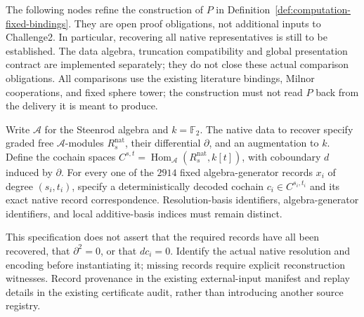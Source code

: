 The following nodes refine the construction of $P$ in
Definition~\ref{def:computation-fixed-bindings}. They are open proof
obligations, not additional inputs to Challenge2. In particular, recovering
all native representatives is still to be established. The data algebra,
truncation compatibility and global presentation contract are implemented
separately; they do not close these actual comparison obligations. All comparisons use the existing
literature bindings, Milnor cooperations, and fixed sphere tower; the
construction must not read $P$ back from the delivery it is meant to produce.

\begin{definition}
  \label{def:lin-native-representative-specification}
  \notready
  Write $\mathcal A$ for the Steenrod algebra and $k=\mathbb F_2$.
  The native data to recover specify graded free $\mathcal A$-modules
  $R^{\mathrm{nat}}_s$, their differential $\partial$, and an augmentation
  to $k$. Define the cochain spaces
  $C^{s,t}=\operatorname{Hom}_{\mathcal A}
    (R^{\mathrm{nat}}_s,k[t])$, with coboundary $d$ induced by $\partial$.
  For every one of the $2914$ fixed algebra-generator records $x_i$ of
  degree $(s_i,t_i)$, specify a deterministically decoded cochain
  $c_i\in C^{s_i,t_i}$ and its exact native record correspondence.
  Resolution-basis identifiers, algebra-generator identifiers, and local
  additive-basis indices must remain distinct.

  This specification does not assert that the required records have all
  been recovered, that $\partial^2=0$, or that $dc_i=0$. Identify the actual
  native resolution and encoding before instantiating it; missing records
  require explicit reconstruction witnesses. Record provenance in the
  existing external-input manifest and replay details in the existing
  certificate audit, rather than introducing another source registry.
\end{definition}

